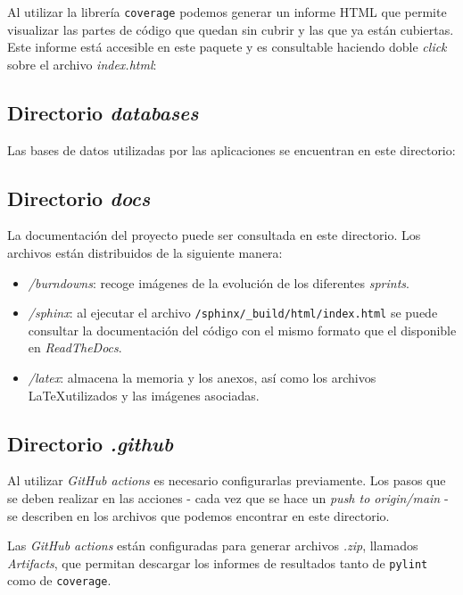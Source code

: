 Al utilizar la librería \texttt{coverage} podemos generar un informe HTML que permite visualizar las partes de código que quedan sin cubrir y las que ya están cubiertas. Este informe está accesible en este paquete y es consultable haciendo doble \emph{click} sobre el archivo \emph{index.html}:



\subsection{Directorio \emph{databases}}

Las bases de datos utilizadas por las aplicaciones se encuentran en este directorio:



\subsection{Directorio \emph{docs}}

La documentación del proyecto puede ser consultada en este directorio. Los archivos están distribuidos de la siguiente manera:

\begin{itemize}
\tightlist
\item
\emph{/burndowns}: recoge imágenes de la evolución de los diferentes \emph{sprints}.
\item
\emph{/sphinx}: al ejecutar el archivo \texttt{/sphinx/\_build/html/index.html} se puede consultar la documentación del código con el mismo formato que el disponible en \emph{ReadTheDocs}.
\item
\emph{/latex}: almacena la memoria y los anexos, así como los archivos \LaTeX utilizados y las imágenes asociadas.
\end{itemize}



\subsection{Directorio \emph{.github}}

Al utilizar \emph{GitHub actions} es necesario configurarlas previamente. Los pasos que se deben realizar en las acciones - cada vez que se hace un \emph{push to origin/main} - se describen en los archivos que podemos encontrar en este directorio.


Las \emph{GitHub actions} están configuradas para generar archivos \emph{.zip}, llamados \emph{Artifacts}, que permitan descargar los informes de resultados tanto de \texttt{pylint} como de \texttt{coverage}. 